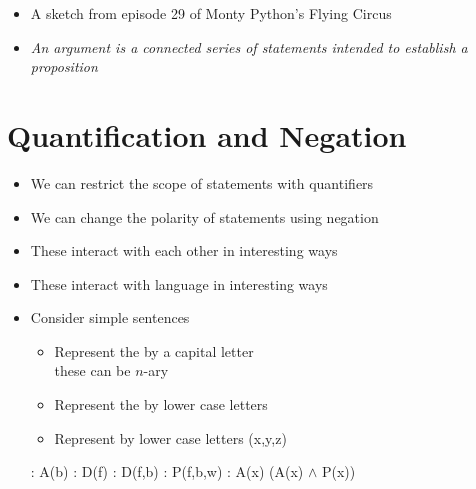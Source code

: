 \documentclass[a4paper,landscape,headrule,footrule,xetex]{foils}
\begin{document}
\begin{itemize}
\item A sketch from episode 29 of
  Monty Python's Flying Circus
\item \textit{An argument is a connected series of statements intended to establish a proposition}
\end{itemize}





\section{Quantification and Negation}

\begin{itemize}
\item We can restrict the scope of statements with quantifiers
\item We can change the polarity of statements using negation
\item These interact with each other in interesting ways
\item These interact with language in interesting ways
\end{itemize}


\begin{itemize}
\item Consider simple sentences
  \begin{itemize}
  \item Represent the  by a capital letter
    \\ these can be $n$-ary
  \item Represent the  by lower case letters
  \item Represent  by lower case letters (x,y,z)
  \end{itemize}
  \begin{exe}
    \ex {}: A(b)
    \ex {}: D(f)
    \ex {}: D(f,b)
    \ex {}: P(f,b,w)
    \ex {}: A(x) \hfill (A(x) $\wedge$ P(x)) 
  \end{exe}
\end{itemize}

\end{document}
